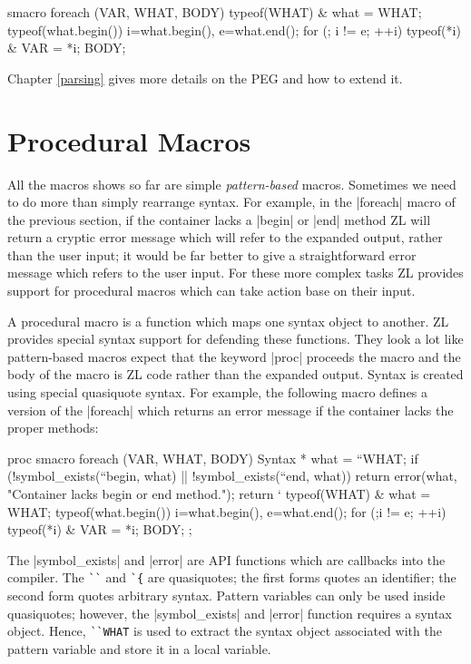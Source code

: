 \begin{code}
smacro foreach (VAR, WHAT, BODY) {
  typeof(WHAT) & what = WHAT;
  typeof(what.begin()) i=what.begin(), e=what.end();
  for (; i != e; ++i) {
    typeof(*i) & VAR = *i;
    BODY;
  }
}
\end{code}

Chapter \ref{parsing} gives more details on the PEG and how to
extend it.

\section{Procedural Macros}
\label{foreach-proc}

All the macros shows so far are simple \textit{pattern-based} macros.
Sometimes we need to do more than simply rearrange syntax.  For
example, in the |foreach| macro of the previous section, if the
container lacks a |begin| or |end| method ZL will return a cryptic
error message which will refer to the expanded output, rather than the
user input; it would be far better to give a straightforward error
message which refers to the user input.  For these more complex tasks
ZL provides support for procedural macros which can take action base on
their input.

A procedural macro is a function which maps one syntax object to
another.  ZL provides special syntax support for defending these
functions.  They look a lot like pattern-based macros expect that the
keyword |proc| proceeds the macro and the body of the macro is ZL code
rather than the expanded output.  Syntax is created using special
quasiquote syntax.  For example, the following macro defines a
version of the |foreach| which returns an error message if the
container lacks the proper methods:
\begin{code}
proc smacro foreach (VAR, WHAT, BODY) {
  Syntax * what = ``WHAT;
  if (!symbol_exists(``begin, what) || !symbol_exists(``end, what))
    return error(what, "Container lacks begin or end method.");
  return `{
    typeof(WHAT) & what = WHAT;
    typeof(what.begin()) i=what.begin(), e=what.end();
    for (;i != e; ++i) {typeof(*i) & VAR = *i; BODY;}
  };
}
\end{code}

The |symbol_exists| and |error| are API functions which are callbacks
into the compiler.  The \verb/``/ and \verb/`{/ are quasiquotes; the
first forms quotes an identifier; the second form quotes arbitrary
syntax.  Pattern variables can only be used inside quasiquotes;
however, the |symbol_exists| and |error| function requires a syntax
object.  Hence, \verb/``WHAT/ is used to extract the syntax object
associated with the pattern variable and store it in a local variable.

